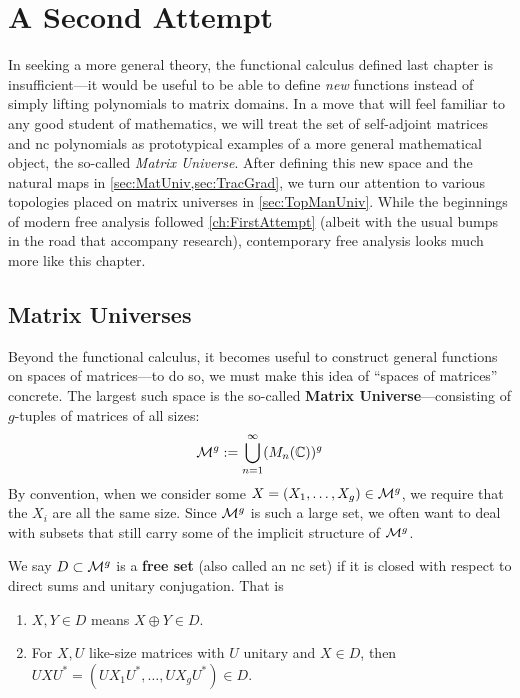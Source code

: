 \chapter{A Second Attempt}\label{ch:SecondAttempt}

In seeking a more general theory, the functional calculus defined last chapter
is insufficient---it would be useful to be able to define \emph{new} functions
instead of simply lifting polynomials to matrix domains. In a move that will
feel familiar to any good student of mathematics, we will treat the
set of self-adjoint matrices and nc polynomials
as prototypical examples of a more general mathematical
object, the so-called \emph{Matrix Universe}.
After defining this new space and the natural maps in
\cref{sec:MatUniv,sec:TracGrad}, we turn our attention to various topologies
placed on matrix universes in \cref{sec:TopManUniv}. While the beginnings of
modern free
analysis followed \cref{ch:FirstAttempt} (albeit with the usual bumps in the
road that accompany research), contemporary free analysis looks much more like this
chapter.

\section{Matrix Universes}%
\label{sec:MatUniv}

Beyond the functional calculus, it becomes useful to construct general functions
on spaces of matrices---to do so, we must make this idea of ``spaces of
matrices'' concrete. The largest such space is the so-called \textbf{Matrix
  Universe}---consisting of \(g\)-tuples of matrices of all sizes:
\[
  \mathcal{M}^g := \bigcup_{n=1}^\infty (M_n(\mathbb{C}))^g
\]
By convention, when we consider some
\(X = \left( X_1, \dots , X_g \right) \in \mathcal{M}^g\), we require that the \(X_i\)
are all the same size. Since \(\mathcal{M}^g\) is such a large set, we often want to
deal with subsets that still carry some of the implicit structure of \(\mathcal{M}^g\).
\begin{definition}
  \label{def:FreeSet}
  We say \(D \subset \mathcal{M}^g\) is a \textbf{free set} (also called an nc set) if it is closed with respect
  to direct sums and unitary conjugation. That is
  \begin{enumerate}
    \item \(X,Y \in D \) means \(X\oplus Y \in D\).
    \item For \(X,U\) like-size matrices with \(U\) unitary and \(X \in D\),
          then \(U X U^* = \left( UX_1U^*, \dots , UX_g U^*  \right) \in D \).
  \end{enumerate}
\end{definition}

